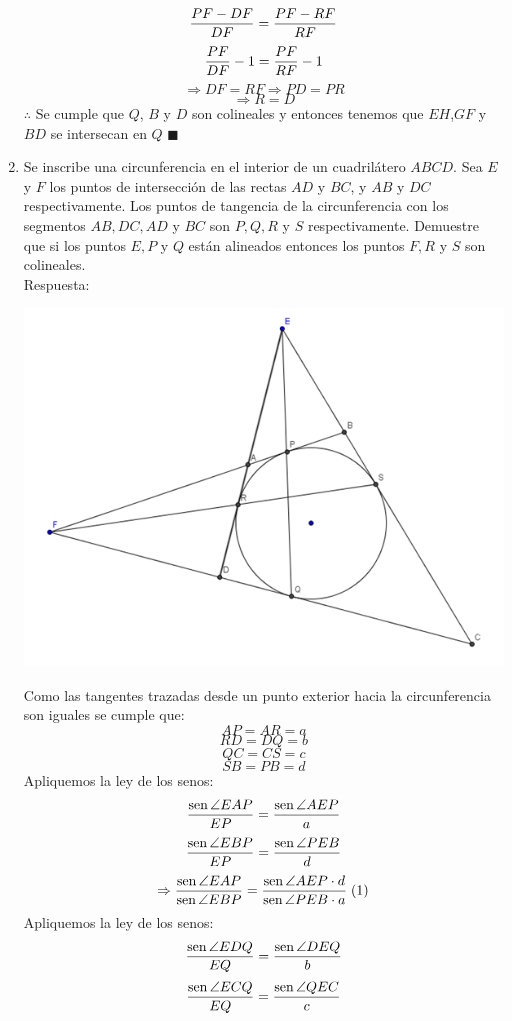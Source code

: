 \documentclass{book}
\newcommand{\sen}{\mathop{\rm sen}\nolimits} %
\begin{document}
\begin{enumerate}
        $${PF-DF\over DF}={PF-RF\over RF}$$
        $${PF\over DF}-1={PF\over RF}-1$$
        $$\Rightarrow DF=RF\Rightarrow PD=PR$$
        $$\Rightarrow R=D$$
        $\therefore$ Se cumple que $Q$, $B$ y $D$ son colineales y entonces tenemos que $EH$,$GF$ y $BD$ se intersecan en $Q$ $\blacksquare$\\
        \item Se inscribe una circunferencia en el interior de un cuadrilátero $ABCD$. Sea $E$ y $F$ los puntos de intersección de las rectas $AD$ y $BC$, y $AB$ y $DC$ respectivamente. Los puntos de tangencia de la circunferencia con los segmentos $AB,DC,AD$ y $BC$ son $P,Q,R$ y $S$ respectivamente. Demuestre que si los puntos $E,P$ y $Q$ están alineados entonces los puntos $F,R$ y $S$ son colineales.\\
        Respuesta:
        \begin{center}
            \includegraphics[scale=1]{imagenes/Geometria/15.png}
        \end{center}
        Como las tangentes trazadas desde un punto exterior hacia la circunferencia son iguales se cumple que:
        $$AP=AR=a$$
        $$RD=DQ=b$$
        $$QC=CS=c$$
        $$SB=PB=d$$
        Apliquemos la ley de los senos:
        $${\sen {\angle EAP}\over EP}={\sen {\angle AEP}\over a}$$
        $${\sen {\angle EBP}\over EP}={\sen {\angle PEB}\over d}$$
        $$\Rightarrow\frac{\sen {\angle EAP}}{\sen {\angle EBP}}=\frac{\sen {\angle AEP}\cdot d}{\sen {\angle PEB}\cdot a}\;(1)$$
        Apliquemos la ley de los senos:
        $${\sen {\angle EDQ}\over EQ}={\sen {\angle DEQ}\over b}$$
        $${\sen {\angle ECQ}\over EQ}={\sen {\angle QEC}\over c}$$

\end{enumerate}
\end{document}
